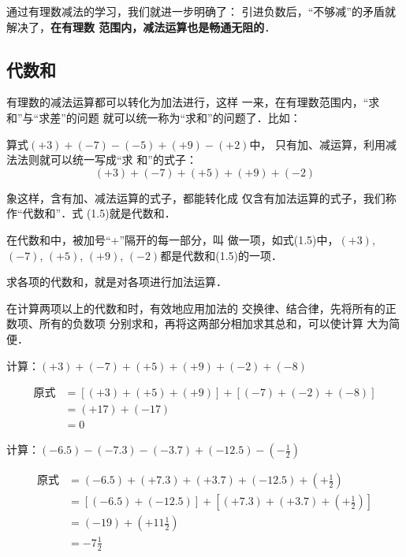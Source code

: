 通过有理数减法的学习，我们就进一步明确了：
引进负数后，“不够减”的矛盾就解决了，\textbf{在有理数
范围内，减法运算也是畅通无阻的}．


\subsection{代数和}
    有理数的减法运算都可以转化为加法进行，这样
一来，在有理数范围内，“求和”与“求差”的问题
就可以统一称为“求和”的问题了．比如：

    算式$(+ 3)+(-7)-(-5)+(+9)-(+2)$中，
只有加、减运算，利用减法法则就可以统一写成“求
和”的式子：
\begin{equation}
    (+ 3)+(-7)+(+5)+(+9)+(-2)
\end{equation}

象这样，含有加、减法运算的式子，都能转化成
仅含有加法运算的式子，我们称作“代数和”．式
  (1.5)就是代数和．

    在代数和中，被加号“+”隔开的每一部分，叫
做一项，如式(1.5)中，$(+3)$, $(-7)$, $(+ 5)$,
  $(+9)$, $(-2)$都是代数和(1.5)的一项．

    求各项的代数和，就是对各项进行加法运算．

    在计算两项以上的代数和时，有效地应用加法的
交换律、结合律，先将所有的正数项、所有的负数项
分别求和，再将这两部分相加求其总和，可以使计算
大为简便．

\begin{example}
计算：$(+3)+(-7)+(+5)+(+9)+(-2)+(-8)$
\end{example}

\begin{solution}
\begin{align*}
    \text{原式}&= [(+3)+(+5)+(+9)]+[(-7)+(-2)+(-8)] \tag{交换、结合律}\\
    &=(+17)+(-17) \tag{同号加法法则}\\
    &=0 \tag{相反数的特性}
\end{align*}
\end{solution}

\begin{example}
    计算：$(-6.5)-(-7.3)-(-3.7)+(-12.5)-\left(-\frac{1}{2}\right)$
\end{example}

\begin{solution}
    \begin{align*}
    \text{原式}&= (-6.5)+(+7.3)+(+3.7)+(-12.5)+\left(+\frac{1}{2}\right) \tag{减法法则}\\
    &=[(-6.5)+(-12.5)]+\left[(+7.3)+(+3.7)+\left(+\frac{1}{2}\right)\right] \tag{交换、结合律}\\
    &=(-19)+\left(+11\frac{1}{2}\right) \tag{同号相加法则}\\
    &=-7\frac{1}{2} \tag{异号相加法则}
\end{align*}
\end{solution}


